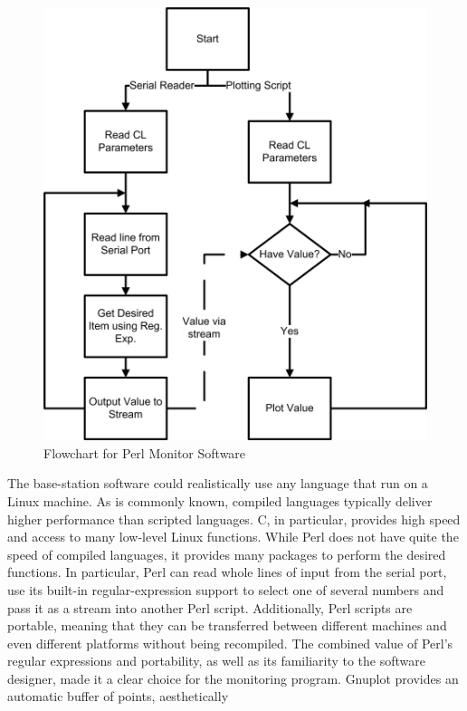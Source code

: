 \begin{figure}[htbp]
  \begin{center}
    \includegraphics[width=5in]{includes/Perl_Flowchart}
    \caption{Flowchart for Perl Monitor Software}
    \label{fig:perl_flowchart}
  \end{center}
\end{figure}

The base-station software could realistically use any language that
run on a Linux machine. As is commonly known, compiled languages
typically deliver higher performance than scripted languages. C, in
particular, provides high speed and access to many low-level Linux
functions. While Perl does not have quite the speed of compiled
languages, it provides many packages to perform the desired
functions. In particular, Perl can read whole lines of input from the
serial port, use its built-in regular-expression support to select one
of several numbers and pass it as a stream into another Perl
script. Additionally, Perl scripts are portable, meaning that they can
be transferred between different machines and even different platforms
without being recompiled. The combined value of Perl's regular
expressions and portability, as well as its familiarity to the
software designer, made it a clear choice for the monitoring
program. Gnuplot provides an automatic buffer of points, aesthetically 

